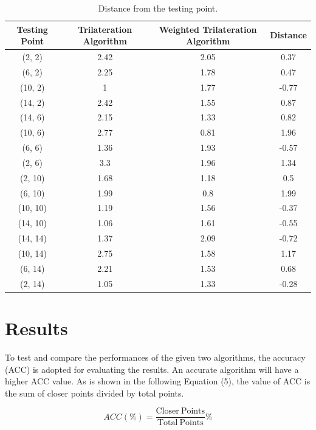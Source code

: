 \documentclass{sigchi}
\newcommand\tabhead[1]{\small\textbf{#1}}
\newcommand\tabhead[1]{\small\textbf{#1}}
\begin{document}
\begin{table}[!h]
  \centering
  \begin{tabular}{|c|c|c|c|}
    \hline
    \tabhead{Testing Point} &
    \multicolumn{1}{|p{0.2\columnwidth}|}{\centering\tabhead{Trilateration Algorithm }} &
    \multicolumn{1}{|p{0.2\columnwidth}|}{\centering\tabhead{Weighted Trilateration Algorithm }} &
    \multicolumn{1}{|p{0.2\columnwidth}|}{\centering\tabhead{Distance }} \\
    \hline
    (2, 2) & 2.42&2.05&0.37 \\
    \hline
    (6, 2) & 2.25& 1.78&0.47 \\
    \hline
    (10, 2) & 1&1.77&-0.77\\
    \hline
    (14, 2) & 2.42&1.55&0.87 \\
    \hline
    (14, 6) &2.15&1.33&0.82  \\
    \hline
    (10, 6) & 2.77&0.81&1.96  \\
    \hline
    (6, 6) & 1.36&1.93&-0.57 \\
    \hline
    (2, 6) &3.3&1.96&1.34 \\
    \hline
    (2, 10) &1.68&1.18&0.5  \\
    \hline
    (6, 10) & 1.99& 0.8 & 1.99 \\
    \hline
    (10, 10) &1.19&1.56&-0.37  \\
    \hline
    (14, 10) &1.06&1.61&-0.55  \\
    \hline
    (14, 14) & 1.37&2.09&-0.72  \\
    \hline
    (10, 14) &2.75&1.58&1.17  \\
    \hline
    (6, 14) & 2.21&1.53&0.68 \\
    \hline
    (2, 14) & 1.05&1.33&-0.28 \\
    \hline
  \end{tabular}
  \caption{Distance from the testing point.}
  \label{tab:table1}
\end{table}

\section{Results}

To test and compare the performances of the given two algorithms, the accuracy (ACC) is adopted for evaluating the results. An accurate algorithm will have a higher ACC value. As is shown in the following Equation (5), the value of ACC is the sum of closer points divided by total points.

\begin{equation*} ACC(\%)=\frac{\text{Closer}\ \text{Points}}{\text{Total}\ \text{Points}}\% \tag{5} \end{equation*}
\end{document}
